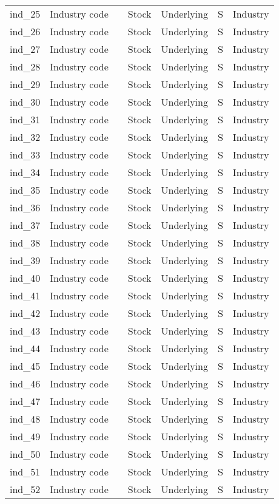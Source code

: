 \begin{longtable}{@{}llp{4cm}llll@{}}
ind\_25&Industry code&&Stock&Underlying&S&Industry\\%
ind\_26&Industry code&&Stock&Underlying&S&Industry\\%
ind\_27&Industry code&&Stock&Underlying&S&Industry\\%
ind\_28&Industry code&&Stock&Underlying&S&Industry\\%
ind\_29&Industry code&&Stock&Underlying&S&Industry\\%
ind\_30&Industry code&&Stock&Underlying&S&Industry\\%
ind\_31&Industry code&&Stock&Underlying&S&Industry\\%
ind\_32&Industry code&&Stock&Underlying&S&Industry\\%
ind\_33&Industry code&&Stock&Underlying&S&Industry\\%
ind\_34&Industry code&&Stock&Underlying&S&Industry\\%
ind\_35&Industry code&&Stock&Underlying&S&Industry\\%
ind\_36&Industry code&&Stock&Underlying&S&Industry\\%
ind\_37&Industry code&&Stock&Underlying&S&Industry\\%
ind\_38&Industry code&&Stock&Underlying&S&Industry\\%
ind\_39&Industry code&&Stock&Underlying&S&Industry\\%
ind\_40&Industry code&&Stock&Underlying&S&Industry\\%
ind\_41&Industry code&&Stock&Underlying&S&Industry\\%
ind\_42&Industry code&&Stock&Underlying&S&Industry\\%
ind\_43&Industry code&&Stock&Underlying&S&Industry\\%
ind\_44&Industry code&&Stock&Underlying&S&Industry\\%
ind\_45&Industry code&&Stock&Underlying&S&Industry\\%
ind\_46&Industry code&&Stock&Underlying&S&Industry\\%
ind\_47&Industry code&&Stock&Underlying&S&Industry\\%
ind\_48&Industry code&&Stock&Underlying&S&Industry\\%
ind\_49&Industry code&&Stock&Underlying&S&Industry\\%
ind\_50&Industry code&&Stock&Underlying&S&Industry\\%
ind\_51&Industry code&&Stock&Underlying&S&Industry\\%
ind\_52&Industry code&&Stock&Underlying&S&Industry\\%

\end{longtable}
